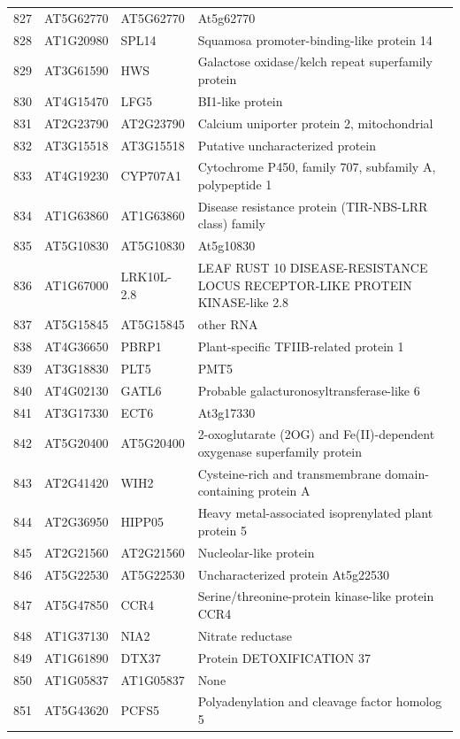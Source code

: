 \documentclass[11pt]{article}
\begin{document}
\begin{center}
\begin{tabular}{rlll}
827 & AT5G62770 & AT5G62770 & At5g62770\\
828 & AT1G20980 & SPL14 & Squamosa promoter-binding-like protein 14\\
829 & AT3G61590 & HWS & Galactose oxidase/kelch repeat superfamily protein\\
830 & AT4G15470 & LFG5 & BI1-like protein\\
831 & AT2G23790 & AT2G23790 & Calcium uniporter protein 2, mitochondrial\\
832 & AT3G15518 & AT3G15518 & Putative uncharacterized protein\\
833 & AT4G19230 & CYP707A1 & Cytochrome P450, family 707, subfamily A, polypeptide 1\\
834 & AT1G63860 & AT1G63860 & Disease resistance protein (TIR-NBS-LRR class) family\\
835 & AT5G10830 & AT5G10830 & At5g10830\\
836 & AT1G67000 & LRK10L-2.8 & LEAF RUST 10 DISEASE-RESISTANCE LOCUS RECEPTOR-LIKE PROTEIN KINASE-like 2.8\\
837 & AT5G15845 & AT5G15845 & other RNA\\
838 & AT4G36650 & PBRP1 & Plant-specific TFIIB-related protein 1\\
839 & AT3G18830 & PLT5 & PMT5\\
840 & AT4G02130 & GATL6 & Probable galacturonosyltransferase-like 6\\
841 & AT3G17330 & ECT6 & At3g17330\\
842 & AT5G20400 & AT5G20400 & 2-oxoglutarate (2OG) and Fe(II)-dependent oxygenase superfamily protein\\
843 & AT2G41420 & WIH2 & Cysteine-rich and transmembrane domain-containing protein A\\
844 & AT2G36950 & HIPP05 & Heavy metal-associated isoprenylated plant protein 5\\
845 & AT2G21560 & AT2G21560 & Nucleolar-like protein\\
846 & AT5G22530 & AT5G22530 & Uncharacterized protein At5g22530\\
847 & AT5G47850 & CCR4 & Serine/threonine-protein kinase-like protein CCR4\\
848 & AT1G37130 & NIA2 & Nitrate reductase\\
849 & AT1G61890 & DTX37 & Protein DETOXIFICATION 37\\
850 & AT1G05837 & AT1G05837 & None\\
851 & AT5G43620 & PCFS5 & Polyadenylation and cleavage factor homolog 5\\

\end{tabular}
\end{center}
\end{document}
